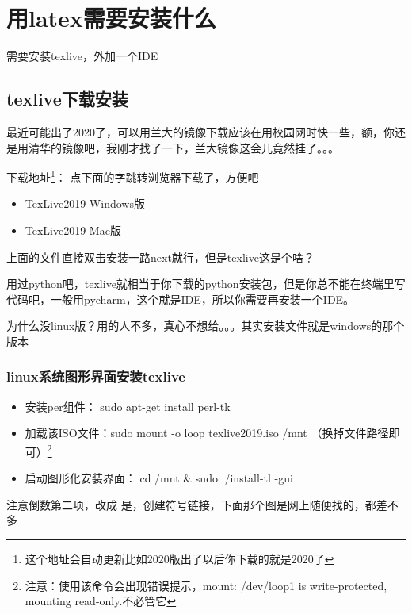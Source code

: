 \documentclass[AutoFakeBold]{LZUThesis2007}
\begin{document}
\section{用latex需要安装什么}
需要安装texlive，外加一个IDE

\subsection{texlive下载安装}
最近可能出了2020了，可以用兰大的镜像下载应该在用校园网时快一些，额，你还是用清华的镜像吧，我刚才找了一下，兰大镜像这会儿竟然挂了。。。

下载地址\footnote{这个地址会自动更新比如2020版出了以后你下载的就是2020了}： 点下面的字跳转浏览器下载了，方便吧

\begin{itemize}
	\item \href{https://mirrors.tuna.tsinghua.edu.cn/CTAN/systems/texlive/Images/texlive.iso}{TexLive2019 \quad Windows版}
	\item \href{http://tug.org/cgi-bin/mactex-download/MacTeX.pkg}{TexLive2019 \quad Mac版}
\end{itemize}

上面的文件直接双击安装一路next就行，但是texlive这是个啥？

用过python吧，texlive就相当于你下载的python安装包，但是你总不能在终端里写代码吧，一般用pycharm，这个就是IDE，所以你需要再安装一个IDE。


为什么没linux版？用的人不多，真心不想给。。。其实安装文件就是windows的那个版本

\subsubsection{linux系统图形界面安装texlive} %
\label{ssub:linux图形界面安装方式}

\begin{itemize}
	\item[1. ] 安装per组件： sudo apt-get install perl-tk
	\item[2. ] 加载该ISO文件：sudo mount -o loop texlive2019.iso /mnt （换掉文件路径即可）\footnote{注意：使用该命令会出现错误提示，mount: /dev/loop1 is write-protected, mounting read-only.不必管它}
	\item[3. ]启动图形化安装界面： cd /mnt \& sudo ./install-tl -gui
\end{itemize}

注意倒数第二项，改成 是，创建符号链接，下面那个图是网上随便找的，都差不多
\end{document}

